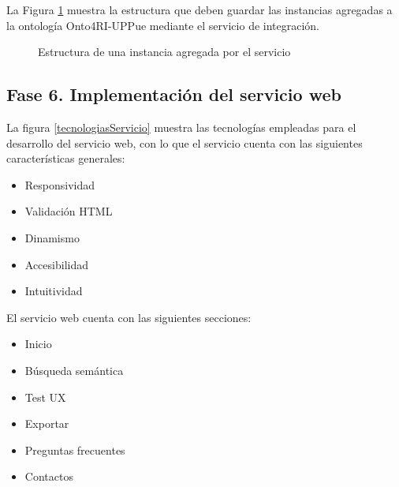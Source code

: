 La Figura \ref{estructuraInstancia} muestra la estructura que deben guardar las instancias agregadas a la ontolog\'ia Onto4RI-UPPue mediante el servicio de integraci\'on.

\begin{figure}[!ht]
	\centering
    \caption{Estructura de una instancia agregada por el servicio}
    \label{estructuraInstancia}
\end{figure}

\subsection{Fase 6. Implementaci\'on del servicio web}

La figura \ref{tecnologiasServicio} muestra las tecnolog\'ias empleadas para el desarrollo del servicio web, con lo que el servicio cuenta con las siguientes caracter\'isticas generales:

\begin{itemize}
    \item Responsividad
    \item Validaci\'on HTML
    \item Dinamismo
    \item Accesibilidad
    \item Intuitividad
\end{itemize}{}

El servicio web cuenta con las siguientes secciones:

\begin{itemize}
    \item Inicio
    \item B\'usqueda sem\'antica
    \item Test UX
    \item Exportar
    \item Preguntas frecuentes
    \item Contactos
\end{itemize}{}

